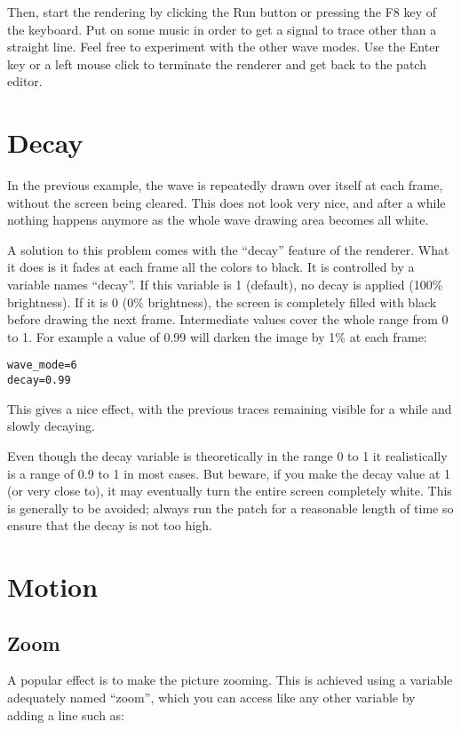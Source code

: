 \documentclass[11pt, a5paper, pagesize]{scrbook}
\begin{document}
Then, start the rendering by clicking the Run button or pressing the F8 key of the keyboard. Put on some music in order to get a signal to trace other than a straight line. Feel free to experiment with the other wave modes. Use the Enter key or a left mouse click to terminate the renderer and get back to the patch editor.

\section{Decay}
In the previous example, the wave is repeatedly drawn over itself at each frame, without the screen being cleared. This does not look very nice, and after a while nothing happens anymore as the whole wave drawing area becomes all white.

A solution to this problem comes with the ``decay'' feature of the renderer. What it does is it fades at each frame all the colors to black. It is controlled by a variable names ``decay''. If this variable is 1 (default), no decay is applied (100\% brightness). If it is 0 (0\% brightness), the screen is completely filled with black before drawing the next frame. Intermediate values cover the whole range from 0 to 1. For example a value of 0.99 will darken the image by 1\% at each frame:

\begin{verbatim}
wave_mode=6
decay=0.99
\end{verbatim}


This gives a nice effect, with the previous traces remaining visible for a while and slowly decaying.

Even though the decay variable is theoretically in the range 0 to 1 it realistically is a range of 0.9 to 1 in most cases. But beware, if you make the decay value at 1 (or very close to), it may eventually turn the entire screen completely white. This is generally to be avoided; always run the patch for a reasonable length of time so ensure that the decay is not too high.

\section{Motion}
\subsection{Zoom}
A popular effect is to make the picture zooming. This is achieved using a variable adequately named ``zoom'', which you can access like any other variable by adding a line such as:
\end{document}
